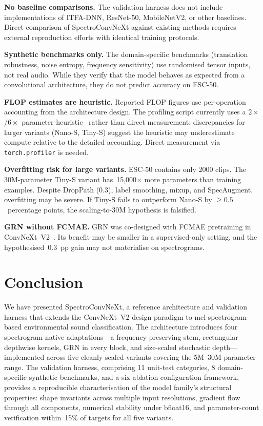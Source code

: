 \documentclass{article}
\begin{document}
\textbf{No baseline comparisons.} The validation harness does not include
implementations of ITFA-DNN, ResNet-50, MobileNetV2, or other baselines.
Direct comparison of SpectroConvNeXt against existing methods requires
external reproduction efforts with identical training protocols.

\textbf{Synthetic benchmarks only.} The domain-specific benchmarks
(translation robustness, noise entropy, frequency sensitivity) use randomised
tensor inputs, not real audio. While they verify that the model behaves as
expected from a convolutional architecture, they do not predict accuracy on
ESC-50.

\textbf{FLOP estimates are heuristic.} Reported FLOP figures use per-operation
accounting from the architecture design. The profiling script currently uses a
$2\times$/$6\times$ parameter heuristic~\citep{kaplan2020scaling} rather than
direct measurement; discrepancies for larger variants (Nano-S, Tiny-S) suggest
the heuristic may underestimate compute relative to the detailed accounting.
Direct measurement via \texttt{torch.profiler} is needed.

\textbf{Overfitting risk for large variants.} ESC-50 contains only 2000 clips.
The 30M-parameter Tiny-S variant has~15,000$\times$ more parameters than
training examples. Despite DropPath (0.3), label smoothing, mixup, and
SpecAugment, overfitting may be severe. If Tiny-S fails to outperform Nano-S by
$\geq 0.5$~percentage points, the scaling-to-30M hypothesis is falsified.

\textbf{GRN without FCMAE.} GRN was co-designed with FCMAE pretraining in
ConvNeXt~V2~\citep{woo2023convnextv2}. Its benefit may be smaller in a
supervised-only setting, and the hypothesised~0.3~pp gain may not materialise
on spectrograms.

\section{Conclusion}

We have presented SpectroConvNeXt, a reference architecture and validation
harness that extends the ConvNeXt~V2 design paradigm to mel-spectrogram-based
environmental sound classification. The architecture introduces four
spectrogram-native adaptations---a frequency-preserving stem, rectangular
depthwise kernels, GRN in every block, and size-scaled stochastic
depth---implemented across five cleanly scaled variants covering the 5M--30M
parameter range. The validation harness, comprising 11 unit-test categories,
8 domain-specific synthetic benchmarks, and a six-ablation configuration
framework, provides a reproducible characterisation of the model family's
structural properties: shape invariants across multiple input resolutions,
gradient flow through all components, numerical stability under bfloat16, and
parameter-count verification within~15\% of targets for all five variants.
\end{document}
